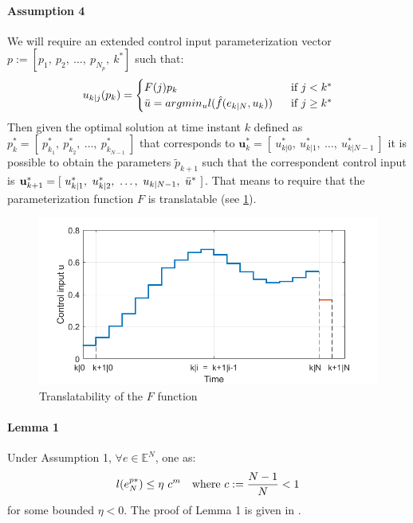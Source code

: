 \paragraph{Assumption 4} We will require an extended control input parameterization vector $p:=[p_1,\ p_2,\ \dots,\ p_{N_p},\ k^*]$ such that: 
\begin{equation*}
\begin{split}
    u_{k|j}(p_k)=
        \begin{cases}
            F(j){p_k}\ \ \ \ \   &\textnormal{if } j<k^* \\
            \Bar{u}=argmin_u l(\hat{f}(e_{k|N},u_k))\ \ &\textnormal{if } j\ge k^*
        \end{cases}
    \end{split}
\end{equation*} 
Then given the optimal solution at time instant $k$ defined as $p_k^*=[\ p_{k_1}^*,\ p_{k_2}^*,\  \dots,\  p_{k_{N-1}}^*\ ]$ that corresponds to $  \textbf{u}_k^*=[\ u_{k|0}^*,\ u_{k|1}^*,\  \dots,\  u_{k|{N-1}}^*\ ]$ it is possible to obtain the parameters $\tilde{p}_{k+1}$ such that the correspondent control input is $  \textbf{u}_{k+1}^*=[\ u_{k|1}^*,\ u_{k|2}^*,\  \dots,\  u_{k|{N-1}},\ \Bar{u}^* \ ]$.
That means to require that the parameterization function $F$ is translatable (see \ref{param_translatability}). \\
\begin{figure}[h!]
	\centering
	\includegraphics[scale=0.4]{IMMAGINI/trans_u}
	\caption{Translatability of the $F$ function}
	\label{param_translatability}
\end{figure}

\paragraph{Lemma 1} Under Assumption 1, $\forall e \in \mathbb{E}^N$, one as:
\begin{equation}
	l(e_N^{p*}) \leq \eta\ c^m\ \ \  \textnormal{where    } c:=\frac{N-1}{N} < 1
 	\label{lemma1}
\end{equation}
for some bounded $\eta < 0$. The proof of Lemma 1 is given in \cite{alamir2018stability}. \\




